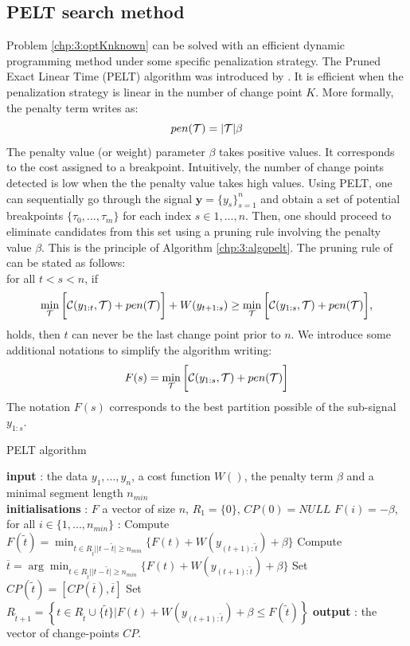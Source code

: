\subsection{PELT search method}

Problem \ref{chp:3:optKnknown} can be solved with an efficient dynamic programming method under some specific penalization strategy. The Pruned Exact Linear Time (PELT) algorithm was introduced by \cite{Killick2012}. It is efficient when the penalization strategy is linear in the number of change point $K$. More formally, the penalty term writes as:
$$pen({\mathcal T}) = \lvert{\mathcal T}\rvert\beta$$ 
The penalty value (or weight) parameter $\beta$ takes positive values. It corresponds to the cost assigned to a breakpoint. Intuitively, the number of change points detected is low when the the penalty value takes high values. Using PELT, one can sequentially go through the signal $\bm y = \{y_s\}_{s=1}^n$ and obtain a set of potential breakpoints $\{\tau_0,...,\tau_m\}$ for each index $s \in {1,...,n}$. Then, one should proceed to eliminate candidates from this set using a pruning rule involving the penalty value $\beta$. This is the principle of Algorithm \ref{chp:3:algopelt}. The pruning rule of \cite{Killick2012} can be stated as follows: \\
 for all $t <s < n$, if
\begin{equation}\label{chp:3:pruning}
 \min_{{\mathcal T}}\bigg[{\mathcal C}(y_{1:t},{\mathcal T})+pen({\mathcal T})\bigg] + W(y_{t+1:s}) \geq \min_{{\mathcal T}}\bigg[{\mathcal C}(y_{1:s},{\mathcal T})+pen({\mathcal T})\bigg], 
\end{equation}
holds, then $t$ can never be the last change point prior to $n$. We introduce some additional notations to simplify the algorithm writing:  
$$F(s) = \min_{{\mathcal T}}\bigg[{\mathcal C}(y_{1:s},{\mathcal T})+pen({\mathcal T})\bigg]$$
The notation $F(s)$ corresponds to the best partition possible of the sub-signal $y_{1:s}$. 
\begin{algorithm}[ht]
\caption{PELT algorithm}\label{chp:3:algopelt}
\begin{algorithmic}
\State \textbf{input} : the data $y_{1},...,y_{n}$, a cost function $W()$, the penalty term $\beta$ and a minimal segment length $n_{min}$ \\
  \State \textbf{initialisations} : $F$ a vector of size $n$, $R_{1}=\lbrace 0\rbrace$, $CP(0)=NULL$  
  \State $F(i) = -\beta$, for all $i \in \{1,...,n_{min}\}$
   :
  \State Compute 
  $ F(\tilde t)=\min_{t\in R_{\tilde t}\vert \lvert t-\tilde{t}\rvert \geq n_{min}}\lbrace F(t)+W(y_{(t+1):\tilde t})+\beta\rbrace $
  \State Compute $ \overline t=\arg \min_{t\in R_{\tilde t}\vert \lvert t-\tilde{t}\rvert \geq n_{min}}\lbrace F(t)+W(y_{(t+1):\tilde t})+\beta\rbrace $ 
  \State Set $CP(\tilde t)=[CP(\overline t), \overline t]$
  \State Set $R_{\tilde t+1}=\left\{t\in R_{\tilde t}\cup \lbrace\tilde t\rbrace \vert F(t)+W(y_{(t+1):\tilde t}) +\beta \le F(\tilde t)   \right\}$ 
\EndFor 
\State \textbf{output} : the vector of change-points $CP$. 
\end{algorithmic}
\end{algorithm} 

